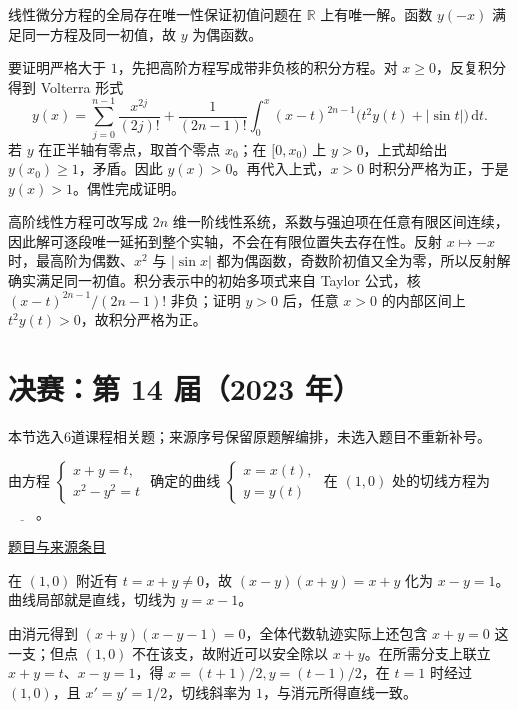 \documentclass[12pt,fontset=fandol]{ctexart}
\begin{document}
\begin{solve}\label{ans:fin13-low:10}

线性微分方程的全局存在唯一性保证初值问题在 $\mathbb R$ 上有唯一解。函数 $y(-x)$ 满足同一方程及同一初值，故 $y$ 为偶函数。

要证明严格大于 $1$，先把高阶方程写成带非负核的积分方程。对 $x\ge0$，反复积分得到 Volterra 形式
\[
y(x)=\sum_{j=0}^{n-1}\frac{x^{2j}}{(2j)!}
+\frac1{(2n-1)!}\int_0^x(x-t)^{2n-1}\bigl(t^2y(t)+|\sin t|\bigr)\,\mathrm dt.
\]
若 $y$ 在正半轴有零点，取首个零点 $x_0$；在 $[0,x_0)$ 上 $y>0$，上式却给出 $y(x_0)\ge1$，矛盾。因此 $y(x)>0$。再代入上式，$x>0$ 时积分严格为正，于是 $y(x)>1$。偶性完成证明。

高阶线性方程可改写成 $2n$ 维一阶线性系统，系数与强迫项在任意有限区间连续，因此解可逐段唯一延拓到整个实轴，不会在有限位置失去存在性。反射 $x\mapsto-x$ 时，最高阶为偶数、$x^2$ 与 $|\sin x|$ 都为偶函数，奇数阶初值又全为零，所以反射解确实满足同一初值。积分表示中的初始多项式来自 Taylor 公式，核 $(x-t)^{2n-1}/(2n-1)!$ 非负；证明 $y>0$ 后，任意 $x>0$ 的内部区间上 $t^2y(t)>0$，故积分严格为正。

\end{solve}

\section{决赛：第 14 届（2023 年）}

本节选入6道课程相关题；来源序号保留原题解编排，未选入题目不重新补号。

\begin{example}[来源序号1]\label{ex:fin14-high:1}\label{pr:fin14-high:1}

由方程 $\begin{cases} x+y=t, \\ x^2-y^2=t \end{cases}$ 确定的曲线 $\begin{cases} x=x(t), \\ y=y(t) \end{cases}$ 在 $(1,0)$ 处的切线方程为$\underline{\qquad}$。

\par\href{https://github.com/lzxcr/cmc-mathematics/blob/64916fa1fdbc3e444a652eca204d5669058ee321/src/problems/finals/14/01.md}{题目与来源条目}

\end{example}

\begin{solve}\label{ans:fin14-high:1}

在 $(1,0)$ 附近有 $t=x+y\ne0$，故 $(x-y)(x+y)=x+y$ 化为 $x-y=1$。曲线局部就是直线，切线为 $\boxed{y=x-1}$。

由消元得到 $(x+y)(x-y-1)=0$，全体代数轨迹实际上还包含 $x+y=0$ 这一支；但点 $(1,0)$ 不在该支，故附近可以安全除以 $x+y$。在所需分支上联立 $x+y=t$、$x-y=1$，得 $x=(t+1)/2,y=(t-1)/2$，在 $t=1$ 时经过 $(1,0)$，且 $x'=y'=1/2$，切线斜率为 $1$，与消元所得直线一致。

\end{solve}
\end{document}
